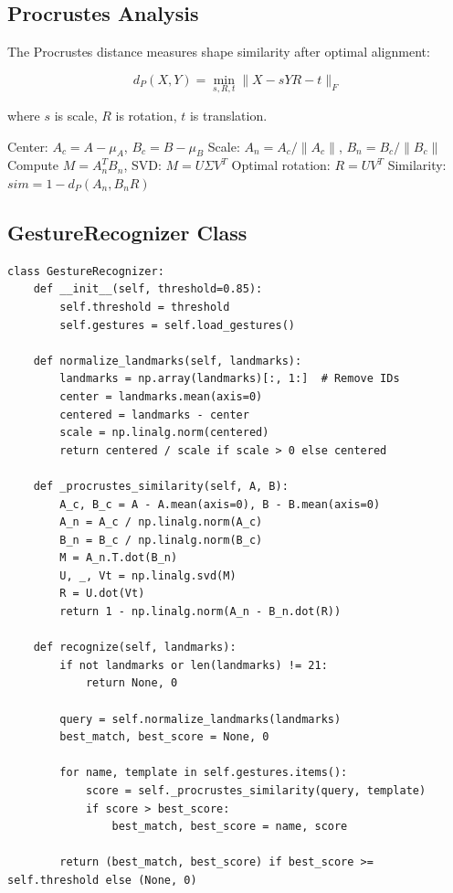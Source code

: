\documentclass[12pt,a4paper]{report}
\begin{document}
\subsection{Procrustes Analysis}

The Procrustes distance measures shape similarity after optimal alignment:

\[
d_P(X, Y) = \min_{s,R,t} \|X - sYR - t\|_F
\]

where $s$ is scale, $R$ is rotation, $t$ is translation.

\begin{algorithm}[H]
\caption{Procrustes Alignment}
\begin{algorithmic}[1]
\STATE Center: $A_c = A - \mu_A$, $B_c = B - \mu_B$
\STATE Scale: $A_n = A_c / \|A_c\|$, $B_n = B_c / \|B_c\|$
\STATE Compute $M = A_n^T B_n$, SVD: $M = U \Sigma V^T$
\STATE Optimal rotation: $R = UV^T$
\STATE Similarity: $sim = 1 - d_P(A_n, B_n R)$
\end{algorithmic}
\end{algorithm}

\subsection{GestureRecognizer Class}

\begin{lstlisting}[caption={Gesture Recognition Implementation}, label={code:gesture_rec}]
class GestureRecognizer:
    def __init__(self, threshold=0.85):
        self.threshold = threshold
        self.gestures = self.load_gestures()
    
    def normalize_landmarks(self, landmarks):
        landmarks = np.array(landmarks)[:, 1:]  # Remove IDs
        center = landmarks.mean(axis=0)
        centered = landmarks - center
        scale = np.linalg.norm(centered)
        return centered / scale if scale > 0 else centered
    
    def _procrustes_similarity(self, A, B):
        A_c, B_c = A - A.mean(axis=0), B - B.mean(axis=0)
        A_n = A_c / np.linalg.norm(A_c)
        B_n = B_c / np.linalg.norm(B_c)
        M = A_n.T.dot(B_n)
        U, _, Vt = np.linalg.svd(M)
        R = U.dot(Vt)
        return 1 - np.linalg.norm(A_n - B_n.dot(R))
    
    def recognize(self, landmarks):
        if not landmarks or len(landmarks) != 21:
            return None, 0
        
        query = self.normalize_landmarks(landmarks)
        best_match, best_score = None, 0
        
        for name, template in self.gestures.items():
            score = self._procrustes_similarity(query, template)
            if score > best_score:
                best_match, best_score = name, score
        
        return (best_match, best_score) if best_score >= self.threshold else (None, 0)
\end{lstlisting}
\end{document}
